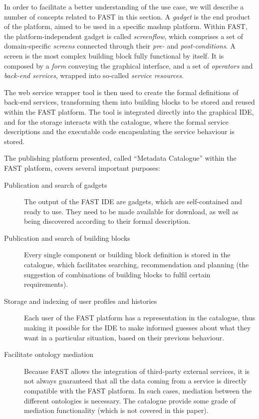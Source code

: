 In order to facilitate a better understanding of the use case, we will describe a number of concepts related to FAST in this section. A \emph{gadget} is the end product of the platform, aimed to be used in a specific mashup platform. Within FAST, the platform-independent gadget is called \emph{screenflow}, which comprises a set of domain-specific \emph{screens} connected through their \emph{pre-} and \emph{post-conditions}. A screen is the most complex building block fully functional by itself. It is composed by a \emph{form} conveying the graphical interface, and a set of \emph{operators} and \emph{back-end services}, wrapped into so-called \emph{service resources}.

The web service wrapper tool is then used to create the formal definitions of back-end services, transforming them into building blocks to be stored and reused within the FAST platform. The tool is integrated directly into the graphical IDE, and for the storage interacts with the catalogue, where the formal service descriptions and the executable code encapsulating the service behaviour is stored.

The publishing platform presented, called ``Metadata Catalogue'' within the FAST platform, covers several important purposes:
\begin{description}
	\item[Publication and search of gadgets] The output of the FAST IDE are gadgets, which are self-contained and ready to use. They need to be made available for download, as well as being discovered according to their formal description.
	\item[Publication and search of building blocks] Every single component or building block definition is stored in the catalogue, which facilitates searching, recommendation and planning (the suggestion of combinations of building blocks to fulfil certain requirements). 
	\item[Storage and indexing of user profiles and histories] Each user of the FAST platform has a representation in the catalogue, thus making it possible for the IDE to make informed guesses about what they want in a particular situation, based on their previous behaviour.
	\item[Facilitate ontology mediation] Because FAST allows the integration of third-party external services, it is not always guaranteed that all the data coming from a service is directly compatible with the FAST platform. In such cases, mediation between the different ontologies is necessary. The catalogue provide some grade of mediation functionality (which is not covered in this paper).
\end{description}
